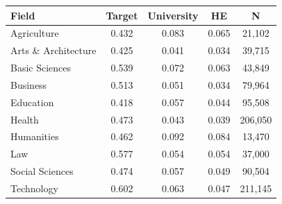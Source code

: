 \begin{tabular}{lcccc}
\toprule
Field & Target & University & HE & N \\
\midrule
Agriculture & 0.432 & 0.083 & 0.065 &    21,102 \\
Arts \& Architecture & 0.425 & 0.041 & 0.034 &    39,715 \\
Basic Sciences & 0.539 & 0.072 & 0.063 &    43,849 \\
Business & 0.513 & 0.051 & 0.034 &    79,964 \\
Education & 0.418 & 0.057 & 0.044 &    95,508 \\
Health & 0.473 & 0.043 & 0.039 &   206,050 \\
Humanities & 0.462 & 0.092 & 0.084 &    13,470 \\
Law & 0.577 & 0.054 & 0.054 &    37,000 \\
Social Sciences & 0.474 & 0.057 & 0.049 &    90,504 \\
Technology & 0.602 & 0.063 & 0.047 &   211,145 \\
\bottomrule
\end{tabular}
